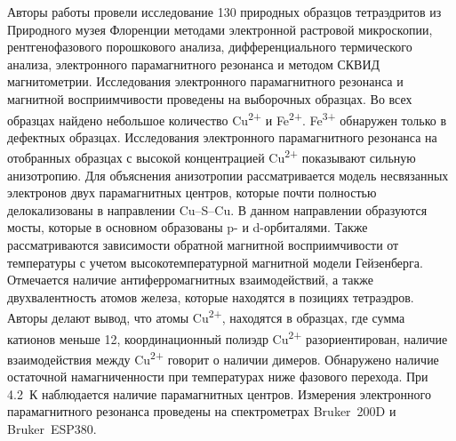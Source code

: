 Авторы работы \cite{DiBenedetto2002} провели исследование 130  природных образцов тетраэдритов из Природного музея Флоренции методами электронной растровой микроскопии, рентгенофазового порошкового анализа, дифференциального термического анализа, электронного парамагнитного резонанса и методом СКВИД магнитометрии. Исследования электронного парамагнитного резонанса и магнитной восприимчивости проведены на выборочных образцах. Во всех образцах найдено небольшое количество Cu\textsuperscript{2+} и Fe\textsuperscript{2+}. Fe\textsuperscript{3+} обнаружен только в дефектных образцах. Исследования электронного парамагнитного резонанса на отобранных образцах с высокой концентрацией Cu\textsuperscript{2+} показывают сильную анизотропию. Для объяснения анизотропии рассматривается модель несвязанных электронов двух парамагнитных центров, которые почти полностью делокализованы в направлении Cu--S--Cu. В данном направлении образуются мосты, которые в основном образованы p- и d-орбиталями\cite{Albright_2013}. Также рассматриваются зависимости обратной магнитной восприимчивости от температуры с учетом высокотемпературной магнитной модели Гейзенберга. Отмечается наличие антиферромагнитных взаимодействий, а также двухвалентность атомов железа, которые находятся в позициях тетраэдров. Авторы делают вывод, что атомы Cu\textsuperscript{2+}, находятся в образцах, где сумма катионов меньше 12, координационный полиэдр Cu\textsuperscript{2+} разориентирован, наличие взаимодействия между Cu\textsuperscript{2+} говорит о наличии димеров. Обнаружено наличие остаточной намагниченности при температурах ниже фазового перехода. При 4.2~К наблюдается наличие парамагнитных центров.  Измерения электронного парамагнитного резонанса проведены на спектрометрах Bruker~200D и Bruker~ESP380.

